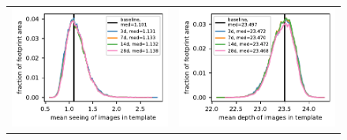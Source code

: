 \documentclass[preprintm,linenumbers]{aastex631}
\begin{document}
\begin{figure}[h]
\begin{tabular}{@{}c@{}c@{}}
	\includegraphics{results/histograms_templates_tscale/hist_first_year_one_snap_v4_0_10yrs_db_noDD_noTwi_doALLTemplateMetrics_reduceSeeingTemplate_u_noDD_noTwi.pdf} &
	\includegraphics{results/histograms_templates_tscale/hist_first_year_one_snap_v4_0_10yrs_db_noDD_noTwi_doALLTemplateMetrics_reduceDepthTemplate_u_noDD_noTwi.pdf} \\
	

\end{tabular}
\end{figure}
\end{document}
